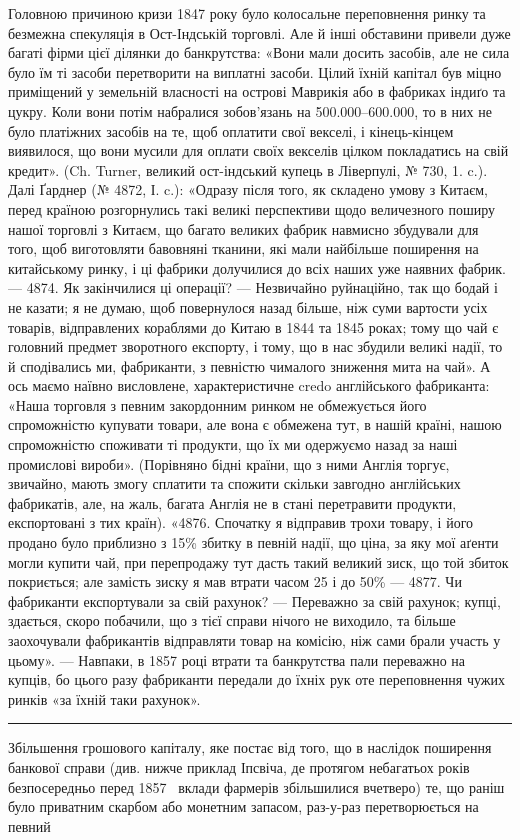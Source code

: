 Головною причиною кризи 1847 року було колосальне переповнення ринку
та безмежна спекуляція в Ост-Індській торговлі. Але й інші обставини привели
дуже багаті фірми цієї ділянки до банкрутства: «Вони мали досить засобів, але не
сила було їм ті засоби перетворити на виплатні засоби. Цілий їхній капітал був міцно
приміщений у земельній власності на острові Маврикія або в фабриках індиґо та
цукру. Коли вони потім набралися зобов’язань на \num{500.000}--\num{600.000}, то
в них не було платіжних засобів на те, щоб оплатити свої векселі, і кінець-кінцем
виявилося, що вони мусили для оплати своїх векселів цілком покладатись
на свій кредит». (Ch. Turner, великий ост-індський купець в Ліверпулі, № 730,
1. c.). Далі Ґарднер (№ 4872, І. c.): «Одразу після того, як складено умову
з Китаєм, перед країною розгорнулись такі великі перспективи щодо величезного
поширу нашої торговлі з Китаєм, що багато великих фабрик навмисно збудували
для того, щоб виготовляти бавовняні тканини, які мали найбільше поширення на китайському
ринку, і ці фабрики долучилися до всіх наших уже наявних фабрик. —
4874. Як закінчилися ці операції? — Незвичайно руйнаційно, так що бодай і не казати;
я не думаю, щоб повернулося назад більше, ніж  суми вартости усіх товарів,
відправлених кораблями до Китаю в 1844 та 1845 роках; тому що чай є головний
предмет зворотного експорту, і тому, що в нас збудили великі надії, то й сподівались ми,
фабриканти, з певністю чималого зниження мита на чай». А ось маємо наївно висловлене,
характеристичне credo англійського фабриканта: «Наша торговля з певним
закордонним ринком не обмежується його спроможністю купувати товари, але вона
є обмежена тут, в нашій країні, нашою спроможністю споживати ті продукти,
що їх ми одержуємо назад за наші промислові вироби». (Порівняно бідні країни,
що з ними Англія торгує, звичайно, мають змогу сплатити та спожити скільки
завгодно англійських фабрикатів, але, на жаль, багата Англія не в стані перетравити
продукти, експортовані з тих країн). «4876. Спочатку я відправив трохи
товару, і його продано було приблизно з 15\% збитку в певній надії, що ціна, за
яку мої аґенти могли купити чай, при перепродажу тут дасть такий великий
зиск, що той збиток покриється; але замість зиску я мав втрати часом 25 і до
50\% — 4877. Чи фабриканти експортували за свій рахунок? — Переважно за свій
рахунок; купці, здається, скоро побачили, що з тієї справи нічого не виходило, та
більше заохочували фабрикантів відправляти товар на комісію, ніж сами брали
участь у цьому». — Навпаки, в 1857 році втрати та банкрутства пали переважно
на купців, бо цього разу фабриканти передали до їхніх рук оте переповнення чужих
ринків «за їхній таки рахунок».

\pfbreak

Збільшення грошового капіталу, яке постає від того, що в наслідок поширення
банкової справи (див. нижче приклад Іпсвіча, де протягом небагатьох років
безпосередньо перед 1857~ вклади фармерів збільшилися вчетверо) те, що раніш було
приватним скарбом або монетним запасом, раз-у-раз перетворюється на певний
\parbreak{}  %

